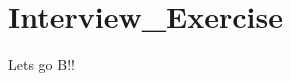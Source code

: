 \chapter{Interview\+\_\+\+Exercise}
\hypertarget{index}{}\label{index}
\label{index_md__2home_2diogo_2Interview__Exercise_2README}%
%
Lets go B!! 